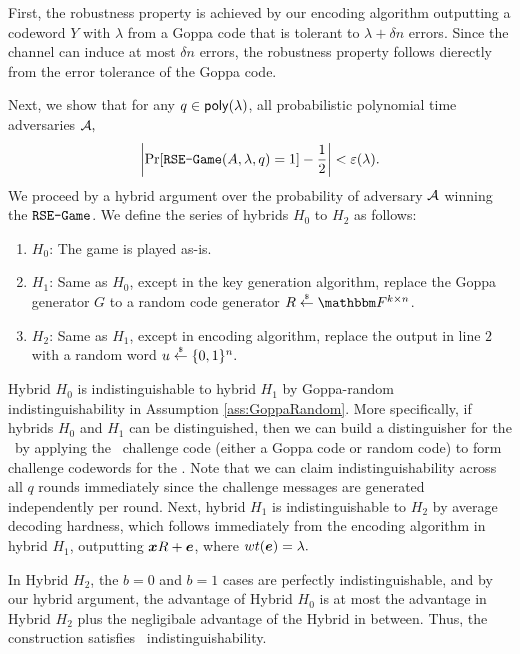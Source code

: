 \begin{IEEEproof}
First, the robustness property is achieved by our encoding algorithm outputting a codeword $Y$ with $\lambda$ from a Goppa code that is tolerant to $\lambda + \delta n$ errors. 
Since the channel can induce at most $\delta n$ errors, the robustness property follows dierectly from the error tolerance of the Goppa code.

Next, we show that for any $q \in \mathsf{poly}(\lambda)$, all probabilistic polynomial time adversaries $\mathcal{A},$
\[\left| \Pr[\texttt{RSE-Game}(A,\lambda,q) = 1] - \frac 1 2\right| < \varepsilon(\lambda).\]
We proceed by a hybrid argument over the probability of adversary $\mathcal{A}$ winning the $\texttt{RSE-Game}$. 
We define the series of hybrids $H_0$ to $H_2$ as follows:
\begin{enumerate}
    \item $H_0$: The game is played as-is.
    \item $H_1$: Same as $H_0$, except in the key generation algorithm, replace the Goppa generator $G$ to a random code generator $R \unif \F^{k \times n}$.
    \item $H_2$: Same as $H_1$, except in encoding algorithm, replace the output in line $2$ with a random word $u \overset{{\scriptscriptstyle\$}}{\leftarrow} \{0,1\}^n.$
\end{enumerate}
Hybrid $H_0$ is indistinguishable to hybrid $H_1$ by Goppa-random indistinguishability in Assumption \ref{ass:GoppaRandom}.
More specifically, if hybrids $H_0$ and $H_1$ can be distinguished, then we can build a distinguisher for the \gdGame\ by applying the \gdGame\ challenge code (either a Goppa code or random code) to form challenge codewords for the \RSEGame.
Note that we can claim indistinguishability across all $q$ rounds immediately since the challenge messages are generated independently per round.
Next, hybrid $H_1$ is indistinguishable to $H_2$ by average decoding hardness, which follows immediately from the encoding algorithm in hybrid $H_1$, outputting ${\boldsymbol{x}} R + \boldsymbol{e}$, where $wt(\boldsymbol{e}) = \lambda.$

In Hybrid $H_2$, the $b = 0$ and $b = 1$ cases are perfectly indistinguishable, and by our hybrid argument, the advantage of Hybrid $H_0$ is at most the advantage in Hybrid $H_2$ plus the negligibale advantage of the Hybrid in between.
Thus, the construction satisfies \RSE\ indistinguishability.
\end{IEEEproof}